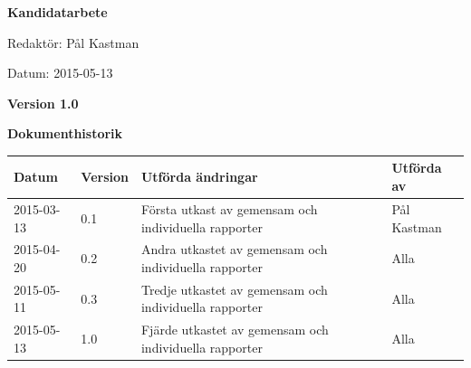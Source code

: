 \documentclass{article}
\begin{document}

\begin{titlepage}
\begin{center}
  \textbf{\Huge Kandidatarbete}
\end{center}
\begin{center}
  {\Large Redaktör: Pål Kastman}
\end{center}
\begin{center}
  {\Large Datum: 2015-05-13}
\end{center}
\begin{center}
  {\Large \textbf{Version 1.0}}
\end{center}
\end{titlepage}
\newpage
\begin{flushleft}
  {\Large \textbf{Dokumenthistorik}}\\[0.5ex]
  \begin{center}
  \vspace{3mm}
    \begin{tabular}{ | l | l | p{5cm} | l |}
    \hline
    \textbf{Datum} & \textbf{Version} & \textbf{Utförda ändringar} & \textbf{Utförda av} \\ \hline
    2015-03-13 & 0.1 & Första utkast av gemensam och individuella rapporter & Pål Kastman \\ \hline
    2015-04-20 & 0.2 & Andra utkastet av gemensam och individuella rapporter & Alla \\ \hline
    2015-05-11 & 0.3 & Tredje utkastet av gemensam och individuella rapporter & Alla \\ \hline
	2015-05-13 & 1.0 & Fjärde utkastet av gemensam och individuella rapporter & Alla \\ \hline    
    \end{tabular}
  \end{center}
\end{flushleft}

\hfill
\end{document}
